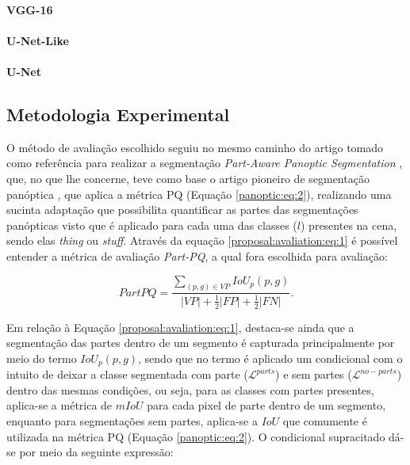 \paragraph{VGG-16}

\paragraph{U-Net-Like}

\paragraph{U-Net}

\subsection{Metodologia Experimental}
\label{project:exp_result}
O método de avaliação escolhido seguiu no mesmo caminho do artigo tomado como referência para realizar a segmentação \textit{Part-Aware Panoptic Segmentation} \cite{DeGeus2021}, que, no que lhe concerne, teve como base o artigo pioneiro de segmentação panóptica \cite{Kirillov2019a}, que aplica a métrica PQ (Equação \ref{panoptic:eq:2}), realizando uma sucinta adaptação que possibilita quantificar as partes das segmentações panópticas visto que é aplicado para cada uma das classes ($l$) presentes na cena, sendo elas \textit{thing} ou \textit{stuff}. Através da equação \ref{proposal:avaliation:eq:1} é possível entender a métrica de avaliação \textit{Part-PQ}, a qual fora escolhida para avaliação:

\begin{equation}
\label{proposal:avaliation:eq:1}
    PartPQ = \frac{\sum _{(p,g) \in VP} IoU_p(p,g)}{|VP|+ \frac{1}{2}|FP| + \frac{1}{2}|FN|}.
\end{equation}

Em relação à Equação \ref{proposal:avaliation:eq:1}, destaca-se ainda que a segmentação das partes dentro de um segmento é capturada principalmente por meio do termo $IoU_p(p,g)$, sendo que no termo é aplicado um condicional com o intuito de deixar a classe segmentada com parte ($\mathcal{L}^{parts}$) e sem partes ($\mathcal{L}^{no-parts}$) dentro das mesmas condições, ou seja, para as classes com partes presentes, aplica-se a métrica de $mIoU$ para cada pixel de parte dentro de um segmento, enquanto para segmentações sem partes, aplica-se a $IoU$ que comumente é utilizada na métrica PQ (Equação \ref{panoptic:eq:2}). O condicional supracitado dá-se por meio da seguinte expressão:

